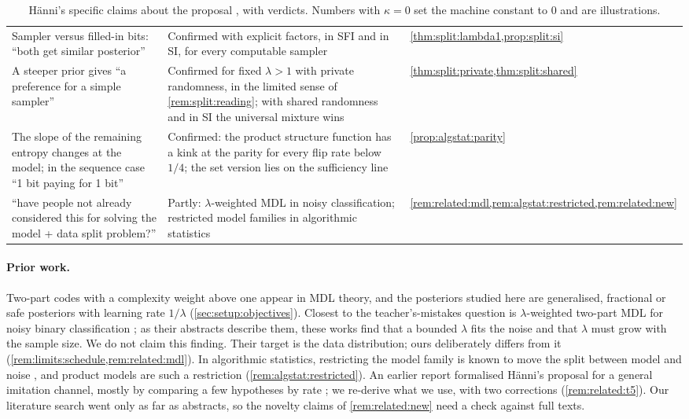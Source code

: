 \begin{table}[!t]
\begin{tabularx}{\linewidth}{@{}>{\raggedright\arraybackslash}p{4.9cm}>{\raggedright\arraybackslash}X>{\raggedright\arraybackslash}p{2.5cm}@{}}
Sampler versus filled-in bits: ``both get similar posterior'' & Confirmed with explicit factors, in SFI and in SI, for every computable sampler & \cref{thm:split:lambda1,prop:split:si}\\
A steeper prior gives ``a preference for a simple sampler'' & Confirmed for fixed $\lambda>1$ with private randomness, in the limited sense of \cref{rem:split:reading}; with shared randomness and in SI the universal mixture wins & \cref{thm:split:private,thm:split:shared}\\
The slope of the remaining entropy changes at the model; in the sequence case ``1 bit paying for 1 bit'' & Confirmed: the product structure function has a kink at the parity for every flip rate below $1/4$; the set version lies on the sufficiency line & \cref{prop:algstat:parity}\\
``have people not already considered this for solving the model + data split problem?'' & Partly: $\lambda$-weighted MDL in noisy classification; restricted model families in algorithmic statistics & \cref{rem:related:mdl,rem:algstat:restricted,rem:related:new}\\
\bottomrule
\end{tabularx}
\caption{H\"anni's specific claims about the proposal \citep{hanni2026notes,hanni2026lesswrong,hanni2026request}, with verdicts. Numbers with $\kappa=0$ set the machine constant to $0$ and are illustrations.}\label{tab:intro:claims}
\end{table}

\paragraph{Prior work.} Two-part codes with a complexity weight above one appear in MDL theory, and the posteriors studied here are generalised, fractional or safe posteriors with learning rate $1/\lambda$ (\cref{sec:setup:objectives}). Closest to the teacher's-mistakes question is $\lambda$-weighted two-part MDL for noisy binary classification \citep{grunwald2007suboptimal,zhu2025quantifying,zhu2026overfitting}; as their abstracts describe them, these works find that a bounded $\lambda$ fits the noise and that $\lambda$ must grow with the sample size. We do not claim this finding. Their target is the data distribution; ours deliberately differs from it (\cref{rem:limits:schedule,rem:related:mdl}). In algorithmic statistics, restricting the model family is known to move the split between model and noise \citep{vereshchagin2010rate}, and product models are such a restriction (\cref{rem:algstat:restricted}). An earlier report formalised H\"anni's proposal for a general imitation channel, mostly by comparing a few hypotheses by rate \citep[section ``Simplicity and normativity from imitation'']{claude2026whatfollows}; we re-derive what we use, with two corrections (\cref{rem:related:t5}). Our literature search went only as far as abstracts, so the novelty claims of \cref{rem:related:new} need a check against full texts.

